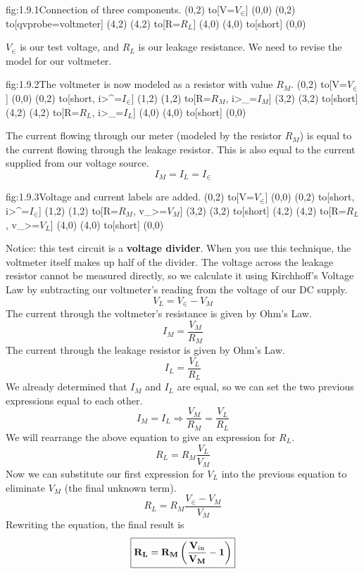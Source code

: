\documentclass{article}
\begin{document}
    \begin{circuit}{fig:1.9.1}{Connection of three components.}
    	(0,2) to[V=$V_{\in}$] (0,0)
    	(0,2) to[qvprobe=voltmeter] (4,2)
    	(4,2) to[R=$R_L$] (4,0)
    	(4,0) to[short] (0,0)
    \end{circuit}

	$V_{\in}$ is our test voltage, and $R_L$ is our leakage resistance. We need to revise the model for our voltmeter.
	
	\begin{circuit}{fig:1.9.2}{The voltmeter is now modeled as a resistor with value $R_M$.}
		(0,2) to[V=$V_{\in}$] (0,0)
		(0,2) to[short, i>^=$I_{\in}$] (1,2)
		(1,2) to[R=$R_M$, i>_=$I_M$] (3,2)
		(3,2) to[short] (4,2)
		(4,2) to[R=$R_L$, i>_=$I_L$] (4,0)
		(4,0) to[short] (0,0)
	\end{circuit}

	The current flowing through our meter (modeled by the resistor $R_M$) is equal to the current flowing through the leakage resistor. This is also equal to the current supplied from our voltage source.
	\[I_M = I_L = I_{\in}\]
	
	\begin{circuit}{fig:1.9.3}{Voltage and current labels are added.}
		(0,2) to[V=$V_{\in}$] (0,0)
		(0,2) to[short, i>^=$I_{\in}$] (1,2)
		(1,2) to[R=$R_M$, v_>=$V_M$] (3,2)
		(3,2) to[short] (4,2)
		(4,2) to[R=$R_L$, v_>=$V_L$] (4,0)
		(4,0) to[short] (0,0)
	\end{circuit}

	Notice: this test circuit is a \textbf{voltage divider}.  When you use this technique, the voltmeter itself makes up half of the divider. The voltage across the leakage resistor cannot be measured directly, so we calculate it using Kirchhoff's Voltage Law by subtracting our voltmeter's reading from the voltage of our DC supply.
	\[V_L = V_{\in} - V_M\]
	The current through the voltmeter's resistance is given by Ohm's Law.
	\[I_M = \frac{V_M}{R_M}\]
	The current through the leakage resistor is given by Ohm's Law.
	\[I_L = \frac{V_L}{R_L}\]
	We already determined that $I_M$ and $I_L$ are equal, so we can set the two previous expressions equal to each other.
	\[I_M = I_L  \Rightarrow  \frac{V_M}{R_M} = \frac{V_L}{R_L}\]
	We will rearrange the above equation to give an expression for $R_L$.
	\[R_L = R_M \frac{V_L}{V_M}\]
	Now we can substitute our first expression for $V_L$ into the previous equation to eliminate $V_M$ (the final unknown term).
	\[R_L = R_M \frac{V_{\in} - V_M}{V_M}\]
	Rewriting the equation, the final result is
	\[\boxed{\mathbf{R_L = R_M \left(\frac{V_{\text{in}}}{V_M} - 1\right)}}\]
	
\end{document}
